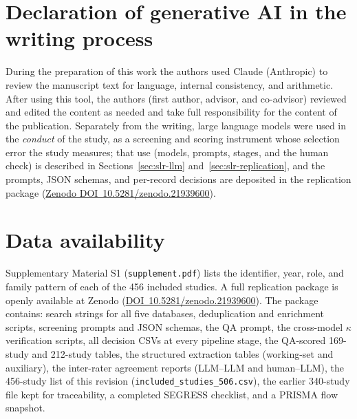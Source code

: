 \documentclass[review,3p,times]{elsarticle}
\newcommand{\zenododoi}{10.5281/zenodo.21939600}
\newcommand{\zenododoiurl}{https://doi.org/\zenododoi}
\begin{document}
\section*{Declaration of generative AI in the writing process}
During the preparation of this work the authors used Claude (Anthropic)
to review the manuscript text for language, internal consistency, and
arithmetic. After using this tool, the authors (first author, advisor,
and co-advisor) reviewed and edited the content as needed and take full
responsibility for the content of the publication. Separately from the
writing, large language models were used in the \emph{conduct} of the
study, as a screening and scoring instrument whose selection error the
study measures; that use (models, prompts, stages, and the human check) is
described in Sections~\ref{sec:slr-llm} and~\ref{sec:slr-replication},
and the prompts, JSON schemas, and per-record decisions are deposited in
the replication package (\href{\zenododoiurl}{Zenodo DOI~\zenododoi}).

\section*{Data availability}
Supplementary Material S1 (\texttt{supplement.pdf}) lists the identifier,
year, role, and family pattern of each of the 456 included studies. A
full replication package is openly available at Zenodo
(\href{\zenododoiurl}{DOI~\zenododoi}).
The package contains: search strings for all five databases, deduplication
and enrichment scripts, screening prompts and JSON schemas, the QA prompt,
the cross-model $\kappa$ verification scripts, all decision CSVs at every
pipeline stage, the QA-scored 169-study and 212-study tables, the
structured extraction tables (working-set and auxiliary), the inter-rater
agreement reports (LLM--LLM and human--LLM), the 456-study list of this
revision (\texttt{included\_studies\_506.csv}), the earlier 340-study file
kept for traceability, a completed SEGRESS checklist, and a
PRISMA flow snapshot.


\end{document}
